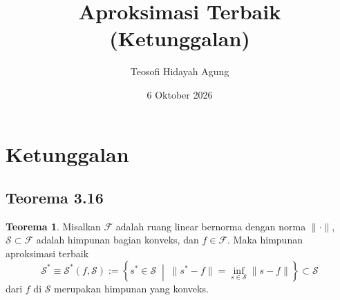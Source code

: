 \documentclass[aspectratio=169,11pt]{beamer}
\date{6 Oktober 2026}
\title[Teori Aproksimasi]{Aproksimasi Terbaik (Ketunggalan)}
\author[Tetew]{Teosofi Hidayah Agung}
\institute[Matematika ITS]{Matematika ITS}
\theoremstyle{definition}
\newtheorem{teorema}{Teorema}
\begin{document}
\begin{frame}
  \titlepage
\end{frame}

\section{Ketunggalan}
\subsection{Teorema 3.16}

\begin{frame}{\insertsection}{\insertsubsection}
  \setcounter{teorema}{15}
  \begin{teorema}
    Misalkan $\mathcal{F}$ adalah ruang linear bernorma dengan norma $\|\cdot\|$, $\mathcal{S} \subset \mathcal{F}$ adalah himpunan bagian konveks, dan $f \in \mathcal{F}$. Maka himpunan aproksimasi terbaik
    \begin{equation*}
      \mathcal{S}^* \equiv \mathcal{S}^*(f, \mathcal{S}) := \left\{ s^* \in \mathcal{S} \;\middle|\; \|s^* - f\| = \inf_{s \in \mathcal{S}} \|s - f\| \right\} \subset \mathcal{S}
    \end{equation*}
    dari $f$ di $\mathcal{S}$ merupakan himpunan yang konveks.
  \end{teorema}
\end{frame}
\end{document}
